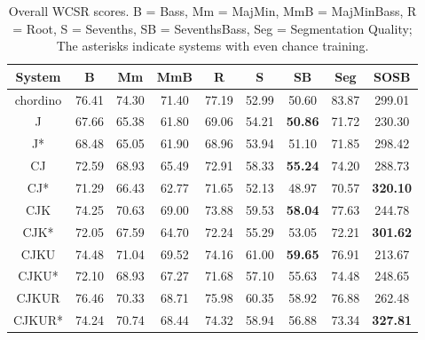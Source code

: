 \begin{table}[htb]
\caption{Overall WCSR scores. B = Bass, Mm = MajMin, MmB = MajMinBass, R = Root, S = Sevenths, SB = SeventhsBass, Seg = Segmentation Quality; The asterisks indicate systems with even chance training.}
\label{tab:4-overallres}
\centering
\footnotesize
\begin{tabular}{|c|c|c|c|c|c|c|c|c|}\hline
System & B & Mm & MmB & R & S & SB & Seg & SOSB \\ \hline
chordino & 76.41 & 74.30 & 71.40 & 77.19 & 52.99 & 50.60 & 83.87 & 299.01\\ \hline
J& 67.66 & 65.38 & 61.80 & 69.06 & 54.21 & \textbf{50.86} & 71.72 & 230.30 \\ \hline
J* & 68.48 & 65.05 & 61.90 & 68.96 & 53.94 & 51.10 & 71.85 & 298.42 \\ \hline
CJ & 72.59 & 68.93 & 65.49 & 72.91 & 58.33 & \textbf{55.24} & 74.20 & 288.73 \\ \hline
CJ* & 71.29 & 66.43 & 62.77 & 71.65 & 52.13 & 48.97 & 70.57 & \textbf{320.10} \\ \hline
CJK & 74.25 & 70.63 & 69.00 & 73.88 & 59.53 & \textbf{58.04} & 77.63 & 244.78 \\ \hline
CJK* & 72.05 & 67.59 & 64.70 & 72.24 & 55.29 & 53.05 & 72.21& \textbf{301.62} \\ \hline
CJKU & 74.48 & 71.04 & 69.52 & 74.16 & 61.00 & \textbf{59.65} & 76.91 & 213.67 \\ \hline
CJKU* & 72.10 & 68.93 & 67.27 & 71.68 & 57.10 & 55.63 & 74.48 & 248.65 \\ \hline
CJKUR & 76.46 & 70.33 & 68.71 & 75.98 & 60.35 & 58.92 & 76.88 & 262.48 \\ \hline
CJKUR* & 74.24 & 70.74 & 68.44 & 74.32 & 58.94 & 56.88 & 73.34 & \textbf{327.81} \\ \hline
\end{tabular}
\end{table}

